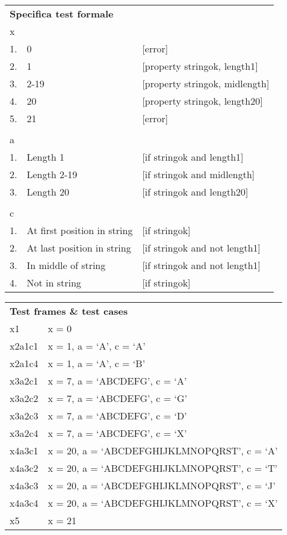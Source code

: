 \vspace{1cm}

\begin{tabular}{lll}
\multicolumn{3}{l}{ \textbf{Specifica test formale} }						\\
x		&								&									\\
1.		&	0							&	[error]							\\
2.		&	1							&	[property stringok, length1]	\\
3.		&	2-19						&	[property stringok, midlength]	\\
4.		&	20							&	[property stringok, length20]	\\
5.		&	21							&	[error]							\\
		&								&									\\
a		&								&									\\
1.		&	Length 1					&	[if stringok and length1]		\\
2.		&	Length 2-19 				&	[if stringok and midlength]		\\
3.		&	Length 20					&	[if stringok and length20]		\\
		&								&									\\
c		&								&									\\
1.		&	At first position in string	&	[if stringok]					\\
2.		&	At last position in string	&	[if stringok and not length1]	\\
3.		&	In middle of string			&	[if stringok and not length1]	\\
4.		&	Not in string				&	[if stringok]					\\
\end{tabular}

\vspace{1cm}

\begin{tabular}{p{2cm}l}
\multicolumn{2}{l}{ \textbf{Test frames \& test cases} }	\\
x1		&	x = 0											\\
x2a1c1	&	x = 1, a = ‘A’, c = ‘A’							\\
x2a1c4	&	x = 1, a = ‘A’, c = ‘B’							\\
x3a2c1	&	x = 7, a = ‘ABCDEFG’, c = ‘A’					\\
x3a2c2	&	x = 7, a = ‘ABCDEFG’, c = ‘G’					\\
x3a2c3	&	x = 7, a = ‘ABCDEFG’, c = ‘D’					\\
x3a2c4	&	x = 7, a = ‘ABCDEFG’, c = ‘X’					\\
x4a3c1	&	x = 20, a = ‘ABCDEFGHIJKLMNOPQRST’, c = ‘A’		\\
x4a3c2	&	x = 20, a = ‘ABCDEFGHIJKLMNOPQRST’, c = ‘T’		\\
x4a3c3	&	x = 20, a = ‘ABCDEFGHIJKLMNOPQRST’, c = ‘J’		\\
x4a3c4	&	x = 20, a = ‘ABCDEFGHIJKLMNOPQRST’, c = ‘X’		\\
x5		&	x = 21											\\
\end{tabular}

